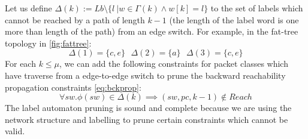 Let us define $\Delta(k) := Lb \setminus \{l \ | w \in \Gamma(k) \wedge w[k] = l\}$ to the set of labels which cannot be reached by a path of length $k - 1$ (the length of the label word is one more than length of the path) from an edge switch. For example, in the fat-tree topology in \cref{fig:fattree}:
\[
\Delta(1) = \{c, e\} \ \ \ \Delta(2) = \{a\} \ \ \ \Delta(3) = \{c,e\}
\]
For each $k \leq \mu$, we can add the following constraints for packet classes which have traverse from a edge-to-edge switch to prune the backward reachability propagation constraints \cref{eq:bckprop}: 
\begin{equation}
	\forall sw. \phi(sw) \in \Delta(k) \implies (sw, pc, k -1) \notin Reach
\end{equation}
The label automaton pruning is sound and complete because we are using the network structure and labelling to prune certain constraints which cannot be valid. 
